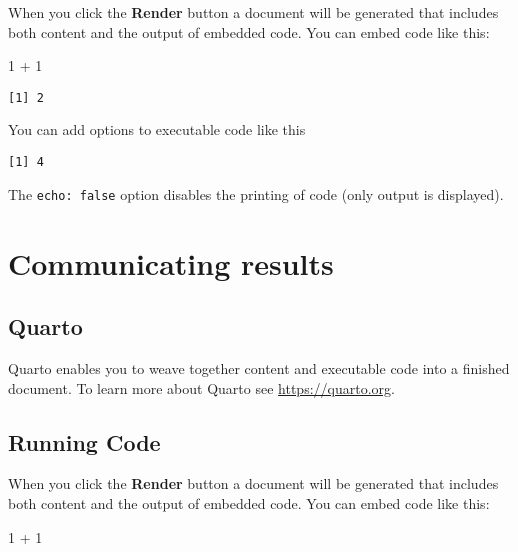 \documentclass[
  letterpaper,
  DIV=11,
  numbers=noendperiod]{scrreprt}
\newenvironment{Shaded}{\begin{snugshade}}{\end{snugshade}}
\newcommand{\DecValTok}[1]{\textcolor[rgb]{0.68,0.00,0.00}{#1}}
\newcommand{\SpecialCharTok}[1]{\textcolor[rgb]{0.37,0.37,0.37}{#1}}
\begin{document}
When you click the \textbf{Render} button a document will be generated
that includes both content and the output of embedded code. You can
embed code like this:

\begin{Shaded}
\begin{Highlighting}[]
\DecValTok{1} \SpecialCharTok{+} \DecValTok{1}
\end{Highlighting}
\end{Shaded}

\begin{verbatim}
[1] 2
\end{verbatim}

You can add options to executable code like this

\begin{verbatim}
[1] 4
\end{verbatim}

The \texttt{echo:\ false} option disables the printing of code (only
output is displayed).

\hypertarget{communicating-results}{%
\chapter{Communicating results}\label{communicating-results}}

\hypertarget{quarto-10}{%
\section{Quarto}\label{quarto-10}}

Quarto enables you to weave together content and executable code into a
finished document. To learn more about Quarto see
\url{https://quarto.org}.

\hypertarget{running-code-10}{%
\section{Running Code}\label{running-code-10}}

When you click the \textbf{Render} button a document will be generated
that includes both content and the output of embedded code. You can
embed code like this:

\begin{Shaded}
\begin{Highlighting}[]
\DecValTok{1} \SpecialCharTok{+} \DecValTok{1}
\end{Highlighting}
\end{Shaded}
\end{document}
